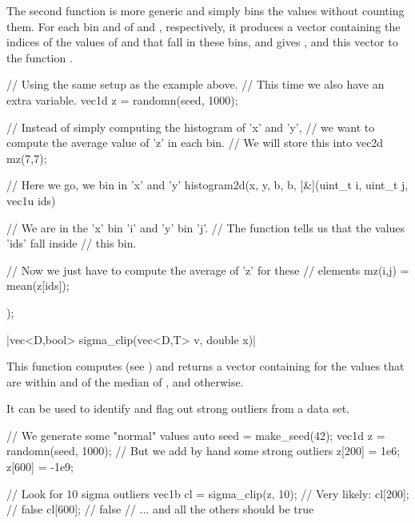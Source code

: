 The second  function is more generic and simply bins the values without counting them. For each bin  and  of  and , respectively, it produces a vector containing the indices of the values of  and  that fall in these bins, and gives ,  and this vector to the function .

\begin{example}
\begin{cppcode}
// Using the same setup as the example above.
// This time we also have an extra variable.
vec1d z = randomn(seed, 1000);

// Instead of simply computing the histogram of 'x' and 'y',
// we want to compute the average value of 'z' in each bin.
// We will store this into
vec2d mz(7,7);

// Here we go, we bin in 'x' and 'y'
histogram2d(x, y, b, b, [&](uint_t i, uint_t j, vec1u ids) {
    // We are in the 'x' bin 'i' and 'y' bin 'j'.
    // The function tells us that the values 'ids' fall inside
    // this bin.

    // Now we just have to compute the average of 'z' for these
    // elements
    mz(i,j) = mean(z[ids]);
});
\end{cppcode}
\end{example}

\funcitem \cppinline|vec<D,bool> sigma_clip(vec<D,T> v, double x)| 

This function computes  (see ) and returns a vector containing  for the values that are within  and  of the median of , and  otherwise.

It can be used to identify and flag out strong outliers from a data set.

\begin{example}
\begin{cppcode}
// We generate some "normal" values
auto seed = make_seed(42);
vec1d z = randomn(seed, 1000);
// But we add by hand some strong outliers
z[200] = 1e6;
z[600] = -1e9;

// Look for 10 sigma outliers
vec1b cl = sigma_clip(z, 10);
// Very likely:
cl[200]; // false
cl[600]; // false
// ... and all the others should be true
\end{cppcode}
\end{example}
